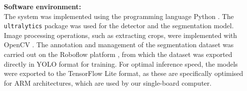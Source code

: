 \textbf{Software environment:} \\
The system was implemented using the programming language Python \cite{van1995python}. The \texttt{ultralytics} package was used for the detector and the segmentation model. Image processing operations, such as extracting crops, were implemented with OpenCV \cite{bradski2000opencv}. The annotation and management of the segmentation dataset was carried out on the Roboflow platform \cite{roboflow2025}, from which the dataset was exported directly in YOLO format for training. For optimal inference speed, the models were exported to the TensorFlow Lite \cite{abadi2016tensorflow} format, as these are specifically optimised for ARM \cite{arm2026architecture} architectures, which are used by our single-board computer.
